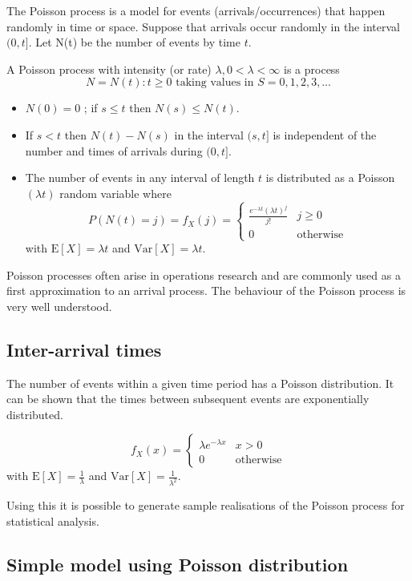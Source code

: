 The Poisson process is a model for events (arrivals/occurrences) that
happen randomly in time or space.  Suppose that arrivals occur
randomly in the interval $(0,t]$.  Let N(t) be the number of events by
time $t$.

A Poisson process with intensity (or rate) $\lambda, 0 < \lambda <
\infty$ is a process
\[
  N = {N(t) : t \geq 0} \mbox{ taking values in } S = {0,1,2,3, \ldots}
\]
\begin{itemize}
\item $N(0) = 0$ ; if $s \leq t$ then $N(s) \leq N(t)$.
\item If $s < t$ then $N(t) - N(s)$ in the interval $(s,t]$ is
independent of the number and times of arrivals during $(0,t]$.
\item The number of events in any interval of length $t$ is
distributed as a Poisson$(\lambda t)$ random variable where
\[
  P(N(t) = j) = f_X(j) =
    \left\{
      \begin{array}{ll}
 	\frac{e^{-\lambda t}(\lambda t)^j}{j!} & j \geq 0 \\
	0 & \mbox{otherwise}
      \end{array}
    \right.
\]
with $\mbox{E}[X] = \lambda t$ and $\mbox{Var}[X] = \lambda t$.
\end{itemize}

Poisson processes often arise in operations research and are
commonly used as a first approximation to an arrival process.  The
behaviour of the Poisson process is very well understood.

\subsection{Inter-arrival times}

The number of events within a given time period has a Poisson
distribution.  It can be shown that the times between subsequent
events are exponentially distributed.

\[
  f_X(x) =
    \left\{
      \begin{array}{ll}
 	\lambda e^{-\lambda x} & x > 0 \\
	0 & \mbox{otherwise}
      \end{array}
    \right.
\]
with $\mbox{E}[X] = \frac{1}{\lambda}$ and $\mbox{Var}[X] =
\frac{1}{\lambda^2}$.

Using this it is possible to generate sample realisations of the
Poisson process for statistical analysis.

\subsection{Simple model using Poisson distribution}

